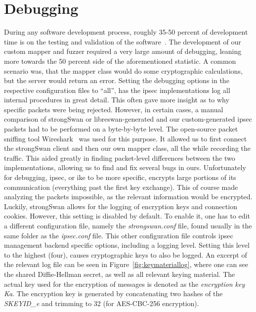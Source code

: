 \section{Debugging}
During any software development process, roughly 35-50 percent of development time is on the testing and validation of the software~\cite{britton2013reversible}. The development of our custom mapper and fuzzer required a very large amount of debugging, leaning more towards the 50 percent side of the aforementioned statistic. A common scenario was, that the mapper class would do some cryptographic calculations, but the server would return an error. Setting the debugging options in the respective configuration files to ``all'', has the \ac{ipsec} implementations log all internal procedures in great detail. This often gave more insight as to why specific packets were being rejected. However, in certain cases, a manual comparison of strongSwan or libreswan-generated and our custom-generated \ac{ipsec} packets had to be performed on a byte-by-byte level. The open-source packet sniffing tool Wireshark~\cite{doc:wireshark} was used for this purpose. It allowed us to first connect the strongSwan client and then our own mapper class, all the while recording the traffic. This aided greatly in finding packet-level differences between the two implementations, allowing us to find and fix several bugs in ours. Unfortunately for debugging, \ac{ipsec}, or \ac{ike} to be more specific, encrypts large portions of its communication (everything past the first key exchange). This of course made analyzing the packets impossible, as the relevant information would be encrypted. Luckily, strongSwan allows for the logging of encryption keys and connection cookies. However, this setting is disabled by default. To enable it, one has to edit a different configuration file, namely the \emph{strongswan.conf} file, found usually in the same folder as the \emph{ipsec.conf} file. This other configuration file controls \ac{ipsec} management backend specific options, including a logging level. Setting this level to the highest (four), causes cryptographic keys to also be logged. An excerpt of the relevant log file can be seen in Figure~\ref{fig:keymateriallog}, where one can see the shared Diffie-Hellman secret, as well as all relevant keying material. The actual key used for the encryption of messages is denoted as the \emph{encryption key Ka}. The encryption key is generated by concatenating two hashes of the \emph{SKEYID\_e} and trimming to \SI{32}{\byte} (for AES-CBC-256 encryption). 

